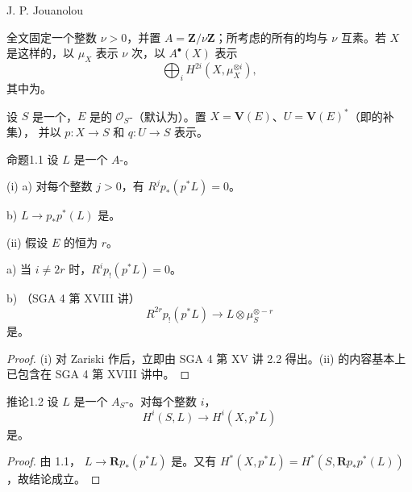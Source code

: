 \begin{center}J. P. Jouanolou\end{center}

全文固定一个整数 $\nu>0$，并置 $A=\mathbf Z/\nu\mathbf Z$；所考虑的所有的均与 $\nu$ 互素。若 $X$ 是这样的，以 $\mu_X$ 表示 $\nu$ 次，以 $A^\bullet(X)$ 表示
\[
 \bigoplus_i H^{2i}(X,\mu_X^{\otimes i}),
\]
其中为。

设 $S$ 是一个，$E$ 是的 $\mathscr O_S$-（默认为）。置 $X=\mathbf V(E)$、$U=\mathbf V(E)^*$（即的补集），
并以 $p:X\to S$ 和 $q:U\to S$ 表示。

\begin{SGAresult}{命题}{1.1}
设 $L$ 是一个 $A$-。

(i) a) 对每个整数 $j>0$，有 $R^jp_*(p^*L)=0$。

b)  $L\to p_*p^*(L)$ 是。

(ii) 假设 $E$ 的恒为 $r$。

a) 当 $i\ne2r$ 时，$R^ip_!(p^*L)=0$。

b) （SGA 4 第 XVIII 讲）
\[
 R^{2r}p_!(p^*L)\longrightarrow L\otimes\mu_S^{\otimes-r}
\]
是。
\end{SGAresult}
\begin{proof}
(i) 对 Zariski 作后，立即由 SGA 4 第 XV 讲 2.2 得出。(ii) 的内容基本上已包含在 SGA 4 第 XVIII 讲中。
\end{proof}

\begin{SGAresult}{推论}{1.2}
设 $L$ 是一个 $A_S$-。对每个整数 $i$，
\[
 H^i(S,L)\longrightarrow H^i(X,p^*L)
\]
是。
\end{SGAresult}
\begin{proof}
由 1.1， $L\to\mathbf Rp_*(p^*L)$ 是。又有 $H^*(X,p^*L)=H^*(S,\mathbf Rp_*p^*(L))$，故结论成立。
\end{proof}

